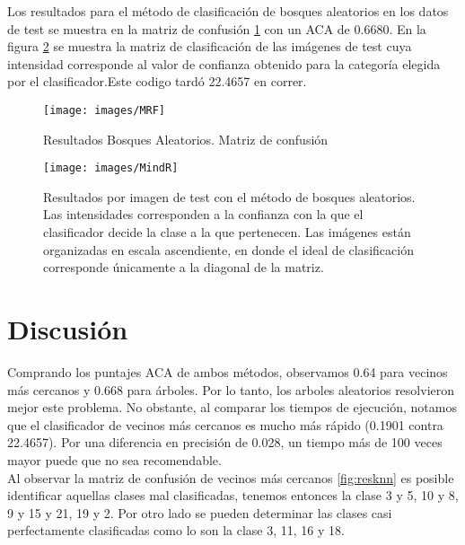 \documentclass[10pt,twocolumn,letterpaper]{article}
\begin{document}
Los resultados para el método de clasificación de bosques aleatorios en los datos de test se muestra en la matriz de confusión \ref{fig:MBosques} con un ACA de 0.6680. En la figura \ref{fig:MindB} se muestra la matriz de clasificación de las imágenes de test cuya intensidad corresponde al valor de confianza obtenido para la categoría elegida por el clasificador.Este codigo tardó 22.4657 en correr.
\begin{figure}[t]
\begin{center}
   \texttt{[image: images/MRF]}
\end{center}
   \caption{Resultados Bosques Aleatorios. Matriz de confusión}
\label{fig:MBosques}
\end{figure}
\begin{figure}[t]
\begin{center}
   \texttt{[image: images/MindR]}
\end{center}
   \caption{Resultados por imagen de test con el método de bosques aleatorios. Las intensidades corresponden a la confianza con la que el clasificador decide la clase a la que pertenecen. Las imágenes están organizadas en escala ascendiente, en donde el ideal de clasificación corresponde únicamente a la diagonal de la matriz.}
\label{fig:MindB}
\end{figure}

\section{Discusión}
Comprando los puntajes ACA de ambos métodos, observamos 0.64 para vecinos más cercanos y 0.668 para árboles. Por lo tanto, los arboles aleatorios resolvieron mejor este problema. No obstante, al comparar los tiempos de ejecución, notamos que el clasificador de vecinos más cercanos es mucho más rápido (0.1901 contra 22.4657).  Por una diferencia en precisión de 0.028, un tiempo más de 100 veces mayor puede que no sea recomendable. \\

Al observar la matriz de confusión de vecinos más cercanos \ref{fig:resknn} es posible identificar aquellas clases mal clasificadas, tenemos entonces la clase 3 y 5, 10 y 8, 9 y 15 y 21, 19 y 2. Por otro lado se pueden determinar las clases casi perfectamente clasificadas como lo son la clase 3, 11, 16 y 18.\\
\end{document}
